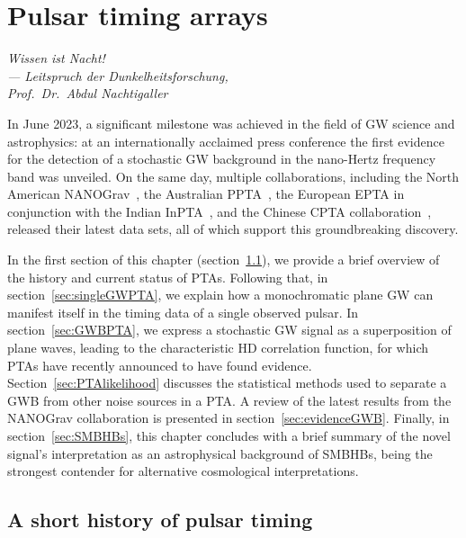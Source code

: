 \chapter{Pulsar timing arrays} \label{chp:PTAs}

\begin{flushright}
	\slshape
	Wissen ist Nacht!\\ \medskip
	--- Leitspruch der Dunkelheitsforschung,\\
	Prof.~Dr.~Abdul Nachtigaller
\end{flushright}


In June 2023, a significant milestone was achieved in the field of \ac{GW} science and astrophysics: at an internationally acclaimed press conference the first evidence for the  detection of a stochastic \ac{GW} background in the nano-Hertz frequency band was unveiled. On the same day, multiple collaborations, including the North American \acs{NANOGrav}~\cite{NANOGrav:2023gor}, the Australian \acs{PPTA}~\cite{Reardon:2023gzh}, the European \acs{EPTA} in conjunction with the Indian \acs{InPTA}~\cite{EPTA:2023fyk}, and the Chinese \acs{CPTA} collaboration~\cite{Xu:2023wog}, released their latest data sets, all of which support this groundbreaking discovery.

In the first section of this chapter (section~\ref{sec:PTAhistory}), we provide a brief overview of the history and current status of \acp{PTA}. Following that, in section~\ref{sec:singleGWPTA}, we explain how a monochromatic plane \ac{GW} can manifest itself in the timing data of a single observed pulsar. In section~\ref{sec:GWBPTA}, we express a stochastic \ac{GW} signal as a superposition of plane waves,  leading to the characteristic \ac{HD} correlation function, for which \acp{PTA} have recently announced to have found evidence. Section~\ref{sec:PTAlikelihood} discusses the statistical methods used to separate a \ac{GWB} from other noise sources in a \ac{PTA}. A review of the latest results from the \ac{NANOGrav} collaboration is presented in section~\ref{sec:evidenceGWB}. Finally, in section~\ref{sec:SMBHBs}, this chapter concludes with a brief summary of the novel signal’s interpretation as an astrophysical background of \acp{SMBHB}, being the strongest contender for alternative cosmological interpretations.

\section{A short history of pulsar timing} \label{sec:PTAhistory}

